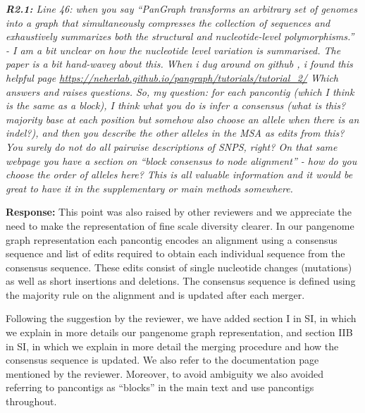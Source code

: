 \documentclass[aps,rmp,onecolumn]{revtex4-1}
\newcommand{\reviewer}[2]{{\it \textbf{#1:} #2\vskip 5mm}}
\newcommand{\response}[1]{{{\color{response}\textbf{Response:} #1}}\vskip 5mm}
\newcommand{\SIgraph}{I}
\newcommand{\SIalgo}{II}
\begin{document}
\reviewer{R2.1}{Line 46: when you say ``PanGraph transforms an arbitrary set of genomes into a graph that simultaneously compresses the collection of sequences and exhaustively summarizes both the structural and nucleotide-level polymorphisms.'' - I am a bit unclear on how the nucleotide level variation is summarised. The paper is a bit hand-wavey about this. When i dug around on github , i found this helpful page \url{https://neherlab.github.io/pangraph/tutorials/tutorial_2/} Which answers and raises questions. So, my question: for each pancontig (which I think is the same as a block), I think what you do is infer a consensus (what is this? majority base at each position but somehow also choose an allele when there is an indel?), and then you describe the other alleles in the MSA as edits from this? You surely do not do all pairwise descriptions of SNPS, right? On that same webpage you have a section on ``block consensus to node alignment'' - how do you choose the order of alleles here? This is all valuable information and it would be great to have it in the supplementary or main methods somewhere.}

\response{This point was also raised by other reviewers and we appreciate the need to make the representation of fine scale diversity clearer.
In our pangenome graph representation each pancontig encodes an alignment using a consensus sequence and list of edits required to obtain each individual sequence from the consensus sequence.
These edits consist of single nucleotide changes (mutations) as well as short insertions and deletions.
The consensus sequence is defined using the majority rule on the alignment and is updated after each merger.

Following the suggestion by the reviewer, we have added section {\SIgraph} in SI, in which we explain in more details our pangenome graph representation, and section {\SIalgo}B in SI, in which we explain in more detail the merging procedure and how the consensus sequence is updated. 
We also refer to the documentation page mentioned by the reviewer. Moreover, to avoid ambiguity we also avoided referring to pancontigs as ``blocks'' in the main text and use pancontigs throughout.}
\end{document}
